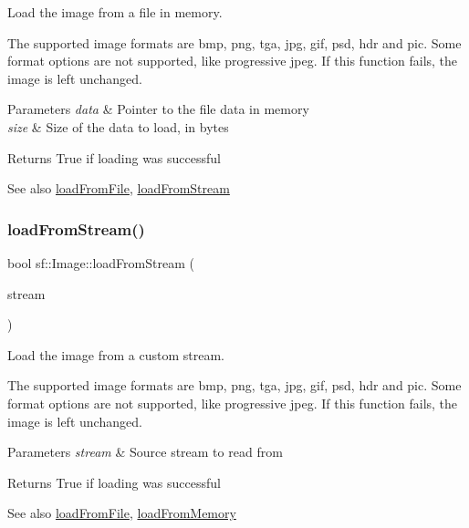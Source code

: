 Load the image from a file in memory. 

The supported image formats are bmp, png, tga, jpg, gif, psd, hdr and pic. Some format options are not supported, like progressive jpeg. If this function fails, the image is left unchanged.


\begin{DoxyParams}{Parameters}
{\em data} & Pointer to the file data in memory \\
\hline
{\em size} & Size of the data to load, in bytes\\
\hline
\end{DoxyParams}
\begin{DoxyReturn}{Returns}
True if loading was successful
\end{DoxyReturn}
\begin{DoxySeeAlso}{See also}
\hyperlink{classsf_1_1_image_a9e4f2aa8e36d0cabde5ed5a4ef80290b}{load\+From\+File}, \hyperlink{classsf_1_1_image_a21122ded0e8368bb06ed3b9acfbfb501}{load\+From\+Stream} 
\end{DoxySeeAlso}
\mbox{\label{classsf_1_1_image_a21122ded0e8368bb06ed3b9acfbfb501}} 
\subsubsection{\texorpdfstring{load\+From\+Stream()}{loadFromStream()}}
{\footnotesize\ttfamily bool sf\+::\+Image\+::load\+From\+Stream (\begin{DoxyParamCaption}\item[{\hyperlink{classsf_1_1_input_stream}{Input\+Stream} \&}]{stream }\end{DoxyParamCaption})}



Load the image from a custom stream. 

The supported image formats are bmp, png, tga, jpg, gif, psd, hdr and pic. Some format options are not supported, like progressive jpeg. If this function fails, the image is left unchanged.


\begin{DoxyParams}{Parameters}
{\em stream} & Source stream to read from\\
\hline
\end{DoxyParams}
\begin{DoxyReturn}{Returns}
True if loading was successful
\end{DoxyReturn}
\begin{DoxySeeAlso}{See also}
\hyperlink{classsf_1_1_image_a9e4f2aa8e36d0cabde5ed5a4ef80290b}{load\+From\+File}, \hyperlink{classsf_1_1_image_aaa6c7afa5851a51cec6ab438faa7354c}{load\+From\+Memory} 
\end{DoxySeeAlso}
\mbox{\label{classsf_1_1_image_a51537fb667f47cbe80395cfd7f9e72a4}} 
